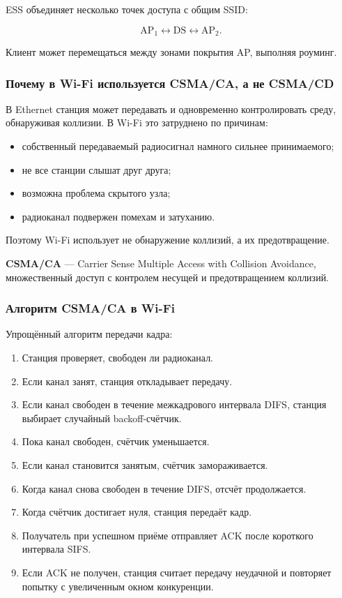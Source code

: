 \documentclass[12pt,a4paper]{article}
\begin{document}
ESS объединяет несколько точек доступа с общим SSID:

\[
\text{AP}_1 \longleftrightarrow \text{DS} \longleftrightarrow \text{AP}_2.
\]

Клиент может перемещаться между зонами покрытия AP, выполняя роуминг.

\subsubsection{Почему в Wi-Fi используется CSMA/CA, а не CSMA/CD}

В Ethernet станция может передавать и одновременно контролировать среду, обнаруживая коллизии. В Wi-Fi это затруднено по причинам:
\begin{itemize}
    \item собственный передаваемый радиосигнал намного сильнее принимаемого;
    \item не все станции слышат друг друга;
    \item возможна проблема скрытого узла;
    \item радиоканал подвержен помехам и затуханию.
\end{itemize}

Поэтому Wi-Fi использует не обнаружение коллизий, а их предотвращение.

\textbf{CSMA/CA} --- Carrier Sense Multiple Access with Collision Avoidance, множественный доступ с контролем несущей и предотвращением коллизий.

\subsubsection{Алгоритм CSMA/CA в Wi-Fi}

Упрощённый алгоритм передачи кадра:

\begin{enumerate}
    \item Станция проверяет, свободен ли радиоканал.
    \item Если канал занят, станция откладывает передачу.
    \item Если канал свободен в течение межкадрового интервала DIFS, станция выбирает случайный backoff-счётчик.
    \item Пока канал свободен, счётчик уменьшается.
    \item Если канал становится занятым, счётчик замораживается.
    \item Когда канал снова свободен в течение DIFS, отсчёт продолжается.
    \item Когда счётчик достигает нуля, станция передаёт кадр.
    \item Получатель при успешном приёме отправляет ACK после короткого интервала SIFS.
    \item Если ACK не получен, станция считает передачу неудачной и повторяет попытку с увеличенным окном конкуренции.
\end{enumerate}
\end{document}
